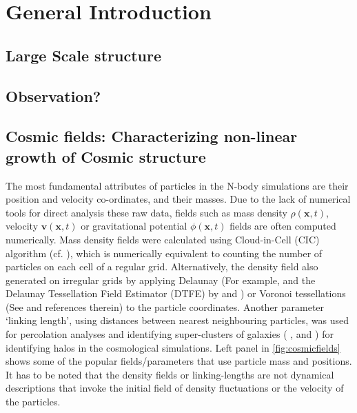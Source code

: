 
\chapter{General Introduction}


\section{Large Scale structure}

\section{Observation?}

\section{Cosmic fields: Characterizing non-linear growth of Cosmic structure}


The most fundamental attributes of particles in the N-body simulations are their position and velocity co-ordinates, and their masses. Due to the lack of numerical tools for direct analysis these raw data, fields such as mass density $\rho(\mathbf{x}, t)$, velocity $\mathbf{v}(\mathbf{x}, t)$ or gravitational potential $\phi(\mathbf{x}, t)$ fields are often computed numerically. Mass density fields were calculated using Cloud-in-Cell (CIC) algorithm (cf. \citealt{Hockney1988}), which is numerically equivalent to counting the number of particles on each cell of a regular grid. Alternatively, the density field also generated on irregular grids by applying Delaunay (For example, \citealt{Icke1991} and the Delaunay Tessellation Field Estimator (DTFE) by \citealt{Schaap2000} and \citealt{Weygaert2009a}) or Voronoi tessellations (See \citealt{Schaap2000} and references therein) to the particle coordinates. Another parameter `linking length', using distances between nearest neighbouring particles, was used for percolation analyses and identifying super-clusters of galaxies ( \citealt{Zeldovich1982}, \citealt{Shandarin1983} and \citealt{Shandarin1983b}) for identifying halos \citealt{Davis1985} in the cosmological simulations. Left panel in \autoref{fig:cosmicfields} shows some of the popular fields/parameters that use particle mass and positions. It has to be noted that the density fields or linking-lengths are not dynamical descriptions that invoke the initial field of density fluctuations or the velocity of the particles. 


